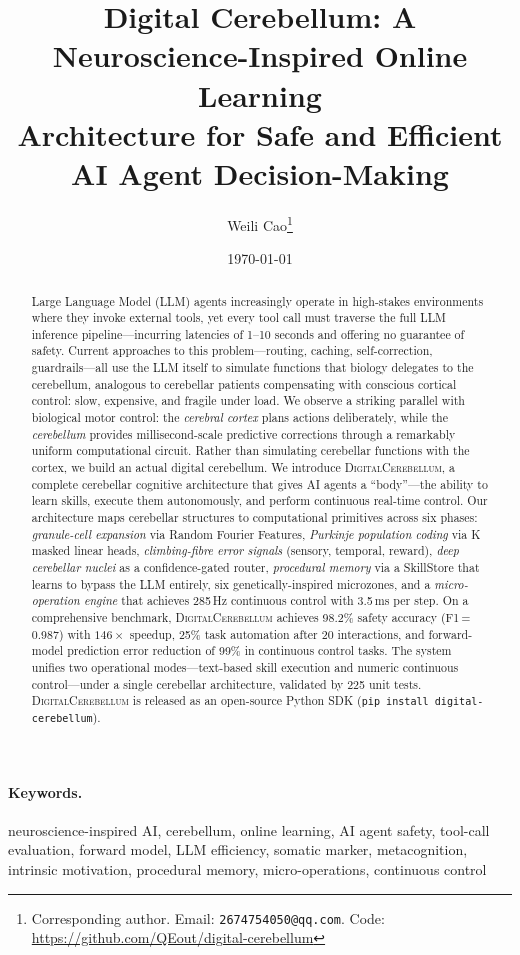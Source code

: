 \documentclass[11pt,a4paper]{article}
\title{Digital Cerebellum: A Neuroscience-Inspired Online Learning\\
       Architecture for Safe and Efficient AI Agent Decision-Making}
\author{
  Weili Cao\thanks{Corresponding author. Email: \texttt{2674754050@qq.com}. Code: \url{https://github.com/QEout/digital-cerebellum}}
}
\date{\today}
\newcommand{\cb}{\textsc{DigitalCerebellum}}
\begin{document}
\maketitle

\begin{abstract}
Large Language Model (LLM) agents increasingly operate in high-stakes environments where they invoke external tools, yet every tool call must traverse the full LLM inference pipeline---incurring latencies of 1--10 seconds and offering no guarantee of safety.
Current approaches to this problem---routing, caching, self-correction, guardrails---all use the LLM itself to simulate functions that biology delegates to the cerebellum, analogous to cerebellar patients compensating with conscious cortical control: slow, expensive, and fragile under load.
We observe a striking parallel with biological motor control: the \emph{cerebral cortex} plans actions deliberately, while the \emph{cerebellum} provides millisecond-scale predictive corrections through a remarkably uniform computational circuit.
Rather than simulating cerebellar functions with the cortex, we build an actual digital cerebellum.
We introduce \cb{}, a complete cerebellar cognitive architecture that gives AI agents a ``body''---the ability to learn skills, execute them autonomously, and perform continuous real-time control.
Our architecture maps cerebellar structures to computational primitives across six phases: \emph{granule-cell expansion} via Random Fourier Features, \emph{Purkinje population coding} via K masked linear heads, \emph{climbing-fibre error signals} (sensory, temporal, reward), \emph{deep cerebellar nuclei} as a confidence-gated router, \emph{procedural memory} via a SkillStore that learns to bypass the LLM entirely, six genetically-inspired microzones, and a \emph{micro-operation engine} that achieves 285\,Hz continuous control with 3.5\,ms per step.
On a comprehensive benchmark, \cb{} achieves 98.2\% safety accuracy (F1\,=\,0.987) with $146\times$ speedup, 25\% task automation after 20 interactions, and forward-model prediction error reduction of 99\% in continuous control tasks.
The system unifies two operational modes---text-based skill execution and numeric continuous control---under a single cerebellar architecture, validated by 225 unit tests.
\cb{} is released as an open-source Python SDK (\texttt{pip install digital-cerebellum}).
\end{abstract}

\paragraph{Keywords.}
neuroscience-inspired AI, cerebellum, online learning, AI agent safety, tool-call evaluation, forward model, LLM efficiency, somatic marker, metacognition, intrinsic motivation, procedural memory, micro-operations, continuous control
\end{document}

